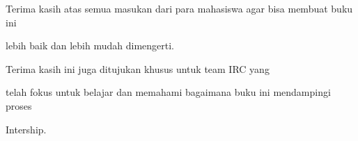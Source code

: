 Terima kasih atas semua masukan dari para mahasiswa agar bisa membuat buku ini 

lebih baik dan lebih mudah dimengerti.



Terima kasih ini juga ditujukan khusus untuk team IRC yang 

telah fokus untuk belajar dan memahami bagaimana buku ini mendampingi proses 

Intership.

